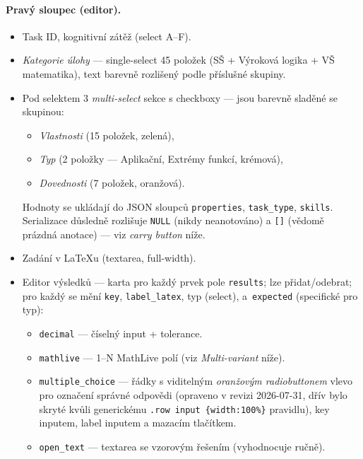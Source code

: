 \documentclass[11pt,a4paper]{article}
\begin{document}
\paragraph{Pravý sloupec (editor).}
\begin{itemize}
  \item Task ID, kognitivní zátěž (select A--F).
  \item \emph{Kategorie úlohy} --- single-select 45 položek (SŠ + Výroková logika + VŠ matematika), text barevně rozlišený podle příslušné skupiny.
  \item Pod selektem 3 \emph{multi-select} sekce s checkboxy --- jsou barevně sladěné se skupinou:
  \begin{itemize}
    \item \emph{Vlastnosti} (15 položek, zelená),
    \item \emph{Typ} (2 položky --- Aplikační, Extrémy funkcí, krémová),
    \item \emph{Dovednosti} (7 položek, oranžová).
  \end{itemize}
  Hodnoty se ukládají do JSON sloupců \texttt{properties}, \texttt{task\_type}, \texttt{skills}. Serializace důsledně rozlišuje \texttt{NULL} (nikdy neanotováno) a \texttt{[]} (vědomě prázdná anotace) --- viz \emph{carry button} níže.
  \item Zadání v LaTeXu (textarea, full-width).
  \item Editor výsledků --- karta pro každý prvek pole \texttt{results}; lze přidat/odebrat; pro každý se mění \texttt{key}, \texttt{label\_latex}, typ (select), a~\texttt{expected} (specifické pro typ):
  \begin{itemize}
    \item \texttt{decimal} --- číselný input + tolerance.
    \item \texttt{mathlive} --- 1--N MathLive polí (viz \emph{Multi-variant} níže).
    \item \texttt{multiple\_choice} --- řádky s viditelným \emph{oranžovým radiobuttonem} vlevo pro označení správné odpovědi (opraveno v revizi 2026-07-31, dřív bylo skryté kvůli generickému \texttt{.row input \{width:100\%\}} pravidlu), key inputem, label inputem a mazacím tlačítkem.
    \item \texttt{open\_text} --- textarea se vzorovým řešením (vyhodnocuje ručně).
  \end{itemize}
\end{itemize}
\end{document}
